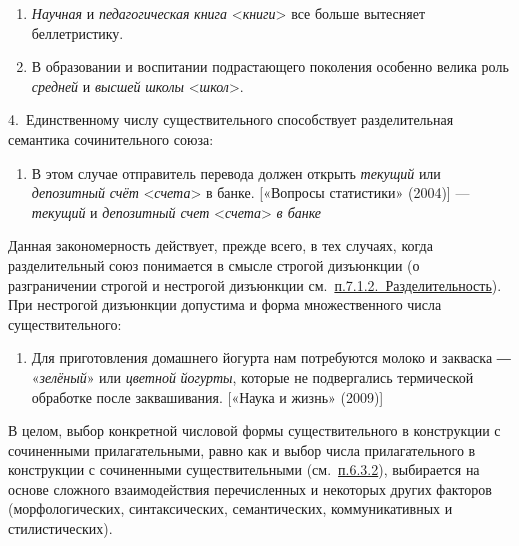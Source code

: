 \begin{enumerate}
  \def\labelenumi{(\arabic{enumi})}
  \setcounter{enumi}{151}
  \item
        \textit{Научная} и \textit{педагогическая} \textit{книга}
        \textless*\textit{книги}\textgreater{} все больше вытесняет
        беллетристику.
  \item
        В образовании и воспитании подрастающего поколения особенно велика
        роль \textit{средней} и \textit{высшей} \textit{школы}
        \textless*\textit{школ}\textgreater.
\end{enumerate}

4.~Единственному числу существительного способствует разделительная
семантика сочинительного союза:

\begin{enumerate}
  \def\labelenumi{(\arabic{enumi})}
  \setcounter{enumi}{153}
  \item
        В этом случае отправитель перевода должен открыть \textit{текущий} или
        \textit{депозитный} \textit{счёт} \textless*\textit{счета}\textgreater{} в
        банке. {[}«Вопросы статистики» (2004){]} --- \textit{текущий} и
        \textit{депозитный счет} \textless{}\textit{счета}\textgreater{} \textit{в
          банке}
\end{enumerate}

Данная закономерность действует, прежде всего, в тех случаях, когда
разделительный союз понимается в смысле строгой дизъюнкции (о
разграничении строгой и нестрогой дизъюнкции
см.~\underline{п.7.1.2.~Разделительность}). При нестрогой дизъюнкции
допустима и форма множественного числа существительного:

\begin{enumerate}
  \def\labelenumi{(\arabic{enumi})}
  \setcounter{enumi}{154}
  \item
        Для приготовления домашнего йогурта нам потребуются молоко и закваска
        ― «\textit{зелёный}» или \textit{цветной} \textit{йогурты}, которые не
        подвергались термической обработке после заквашивания. {[}«Наука и
        жизнь» (2009){]}
\end{enumerate}

В целом, выбор конкретной числовой формы существительного в конструкции
с сочиненными прилагательными, равно как и выбор числа прилагательного в
конструкции с сочиненными существительными (см.~\underline{п.6.3.2}),
выбирается на основе сложного взаимодействия перечисленных и некоторых
других факторов (морфологических, синтаксических, семантических,
коммуникативных и стилистических).

